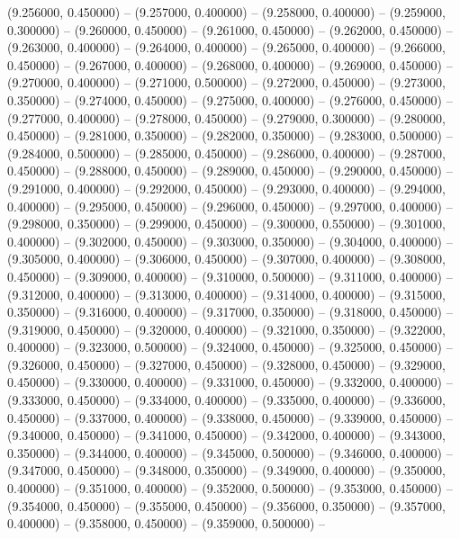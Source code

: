 (9.256000, 0.450000) -- 
(9.257000, 0.400000) -- 
(9.258000, 0.400000) -- 
(9.259000, 0.300000) -- 
(9.260000, 0.450000) -- 
(9.261000, 0.450000) -- 
(9.262000, 0.450000) -- 
(9.263000, 0.400000) -- 
(9.264000, 0.400000) -- 
(9.265000, 0.400000) -- 
(9.266000, 0.450000) -- 
(9.267000, 0.400000) -- 
(9.268000, 0.400000) -- 
(9.269000, 0.450000) -- 
(9.270000, 0.400000) -- 
(9.271000, 0.500000) -- 
(9.272000, 0.450000) -- 
(9.273000, 0.350000) -- 
(9.274000, 0.450000) -- 
(9.275000, 0.400000) -- 
(9.276000, 0.450000) -- 
(9.277000, 0.400000) -- 
(9.278000, 0.450000) -- 
(9.279000, 0.300000) -- 
(9.280000, 0.450000) -- 
(9.281000, 0.350000) -- 
(9.282000, 0.350000) -- 
(9.283000, 0.500000) -- 
(9.284000, 0.500000) -- 
(9.285000, 0.450000) -- 
(9.286000, 0.400000) -- 
(9.287000, 0.450000) -- 
(9.288000, 0.450000) -- 
(9.289000, 0.450000) -- 
(9.290000, 0.450000) -- 
(9.291000, 0.400000) -- 
(9.292000, 0.450000) -- 
(9.293000, 0.400000) -- 
(9.294000, 0.400000) -- 
(9.295000, 0.450000) -- 
(9.296000, 0.450000) -- 
(9.297000, 0.400000) -- 
(9.298000, 0.350000) -- 
(9.299000, 0.450000) -- 
(9.300000, 0.550000) -- 
(9.301000, 0.400000) -- 
(9.302000, 0.450000) -- 
(9.303000, 0.350000) -- 
(9.304000, 0.400000) -- 
(9.305000, 0.400000) -- 
(9.306000, 0.450000) -- 
(9.307000, 0.400000) -- 
(9.308000, 0.450000) -- 
(9.309000, 0.400000) -- 
(9.310000, 0.500000) -- 
(9.311000, 0.400000) -- 
(9.312000, 0.400000) -- 
(9.313000, 0.400000) -- 
(9.314000, 0.400000) -- 
(9.315000, 0.350000) -- 
(9.316000, 0.400000) -- 
(9.317000, 0.350000) -- 
(9.318000, 0.450000) -- 
(9.319000, 0.450000) -- 
(9.320000, 0.400000) -- 
(9.321000, 0.350000) -- 
(9.322000, 0.400000) -- 
(9.323000, 0.500000) -- 
(9.324000, 0.450000) -- 
(9.325000, 0.450000) -- 
(9.326000, 0.450000) -- 
(9.327000, 0.450000) -- 
(9.328000, 0.450000) -- 
(9.329000, 0.450000) -- 
(9.330000, 0.400000) -- 
(9.331000, 0.450000) -- 
(9.332000, 0.400000) -- 
(9.333000, 0.450000) -- 
(9.334000, 0.400000) -- 
(9.335000, 0.400000) -- 
(9.336000, 0.450000) -- 
(9.337000, 0.400000) -- 
(9.338000, 0.450000) -- 
(9.339000, 0.450000) -- 
(9.340000, 0.450000) -- 
(9.341000, 0.450000) -- 
(9.342000, 0.400000) -- 
(9.343000, 0.350000) -- 
(9.344000, 0.400000) -- 
(9.345000, 0.500000) -- 
(9.346000, 0.400000) -- 
(9.347000, 0.450000) -- 
(9.348000, 0.350000) -- 
(9.349000, 0.400000) -- 
(9.350000, 0.400000) -- 
(9.351000, 0.400000) -- 
(9.352000, 0.500000) -- 
(9.353000, 0.450000) -- 
(9.354000, 0.450000) -- 
(9.355000, 0.450000) -- 
(9.356000, 0.350000) -- 
(9.357000, 0.400000) -- 
(9.358000, 0.450000) -- 
(9.359000, 0.500000) -- 
